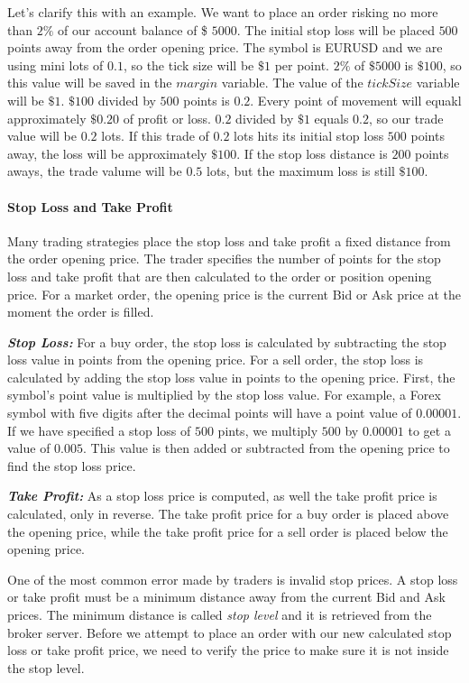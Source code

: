 Let's clarify this with an example. We want to place an order risking no more than $2\%$ of our account balance of \$ $5000$. The initial stop loss will be placed $500$ points away from the order opening price. The symbol is EURUSD and we are using mini lots of $0.1$, so the tick size will be $\$1$ per point. $2\%$ of $\$5000$ is $\$100$, so this value will be saved in the $margin$ variable. The value of the $tickSize$ variable will be $\$1$.
$\$100$ divided by $500$ points is $0.2$. Every point of movement will equakl approximately $\$0.20$ of profit or loss. $0.2$ divided by $\$1$ equals $0.2$, so our trade value will be $0.2$ lots. If this trade of $0.2$ lots hits its initial stop loss $500$ points away, the loss will be approximately $\$100$. If the stop loss distance is $200$ points aways, the trade valume will be $0.5$ lots, but the maximum loss is still $\$100$.

\paragraph{\textbf{Stop Loss and Take Profit}}\mbox{}

Many trading strategies place the stop loss and take profit a fixed distance from the order opening price. The trader specifies the number of points for the stop loss and take profit that are then calculated to the order or position opening price. For a market order, the opening price is the current Bid or Ask price at the moment the order is filled.

\textit{\textit{\textbf{Stop Loss:}}} For a buy order, the stop loss is calculated by subtracting the stop loss value in points from the opening price. For a sell order, the stop loss is calculated by adding the stop loss value in points to the opening price.
First, the symbol's point value is multiplied by the stop loss value. For example, a Forex symbol with five digits after the decimal points will have a point value of $0.00001$. If we have specified a stop loss of $500$ pints, we multiply $500$ by $0.00001$ to get a value of $0.005$. This value is then added or subtracted from the opening price to find the stop loss price.

\textit{\textit{\textbf{Take Profit:}}} As a stop loss price is computed, as well the take profit price is calculated, only in reverse. The take profit price for a buy order is placed above the opening price, while the take profit price for a sell order is placed below the opening price.

One of the most common error made by traders is invalid stop prices. A stop loss or take profit must be a minimum distance away from the current Bid and Ask prices. The minimum distance is called \textit{stop level} and it is retrieved from the broker server. Before we attempt to place an order with our new calculated stop loss or take profit price, we need to verify the price to make sure it is not inside the stop level.

